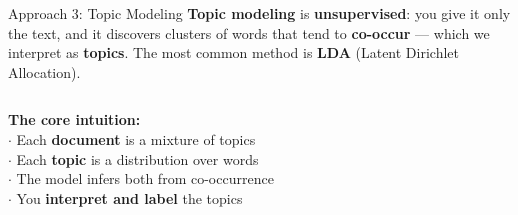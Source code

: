 \documentclass[aspectratio=169]{beamer}
\begin{document}
\begin{frame}{Approach 3: Topic Modeling}
\vspace{0.2cm}
{\small \textbf{Topic modeling} is \textbf{unsupervised}: you give it only the text,
and it discovers clusters of words that tend to \textbf{co-occur} --- which we
interpret as \textbf{topics}. The most common method is \textbf{LDA}
(Latent Dirichlet Allocation).}

\medskip
\begin{columns}[T]
  \vspace{0pt}
  {\small\textbf{The core intuition:}}\\[4pt]
  {\small
  \textcolor{wurgreen}{$\cdot$} Each \textbf{document} is a mixture of topics\\[4pt]
  \textcolor{wurgreen}{$\cdot$} Each \textbf{topic} is a distribution over words\\[4pt]
  \textcolor{wurgreen}{$\cdot$} The model infers both from co-occurrence\\[4pt]
  \textcolor{wurgreen}{$\cdot$} You \textbf{interpret and label} the topics}

  \vspace{0pt}
\end{columns}
\end{frame}
\end{document}
